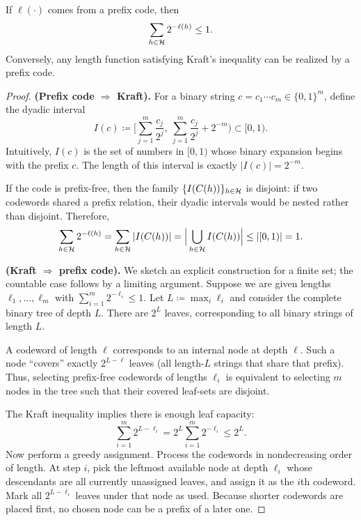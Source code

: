 \documentclass{article}
\numberwithin{equation}{section}
\newcommand{\cH}{{\cal H}}
\begin{document}
\begin{theorem}
\label{thm:kraft-lecture2}
If $\ell(\cdot)$ comes from a prefix code, then
\begin{equation}
    \sum_{h\in\cH} 2^{-\ell(h)} \le 1.
\end{equation}
Conversely, any length function satisfying Kraft's inequality can be realized by a prefix code.
\end{theorem}
\begin{proof}
\textbf{(Prefix code $\Rightarrow$ Kraft).}
For a binary string $c=c_1\cdots c_m\in\{0,1\}^m$, define the dyadic interval
\begin{equation}
    I(c) \coloneqq \Big[\sum_{j=1}^m \frac{c_j}{2^j},\ \sum_{j=1}^m \frac{c_j}{2^j} + 2^{-m}\Big) \subset [0,1).
\end{equation}
Intuitively, $I(c)$ is the set of numbers in $[0,1)$ whose binary expansion begins with the prefix $c$.
The length of this interval is exactly $|I(c)|=2^{-m}$.

If the code is prefix-free, then the family $\{I(C(h))\}_{h\in\cH}$ is disjoint: if two codewords shared a prefix relation, their dyadic intervals would be nested rather than disjoint.
Therefore,
\begin{equation}
    \sum_{h\in\cH} 2^{-\ell(h)}
    = \sum_{h\in\cH} |I(C(h))|
    = \Big|\bigcup_{h\in\cH} I(C(h))\Big|
    \le |[0,1)| = 1.
\end{equation}

\textbf{(Kraft $\Rightarrow$ prefix code).}
We sketch an explicit construction for a finite set; the countable case follows by a limiting argument.
Suppose we are given lengths $\ell_1,\dots,\ell_m$ with
\(\sum_{i=1}^m 2^{-\ell_i}\le 1\).
Let $L\coloneqq \max_i \ell_i$ and consider the complete binary tree of depth $L$.
There are $2^L$ leaves, corresponding to all binary strings of length $L$.

A codeword of length $\ell$ corresponds to an internal node at depth $\ell$.
Such a node ``covers'' exactly $2^{L-\ell}$ leaves (all length-$L$ strings that share that prefix).
Thus, selecting prefix-free codewords of lengths $\ell_i$ is equivalent to selecting $m$ nodes in the tree such that their covered leaf-sets are disjoint.

The Kraft inequality implies there is enough leaf capacity:
\begin{equation}
    \sum_{i=1}^m 2^{L-\ell_i} = 2^L\sum_{i=1}^m 2^{-\ell_i} \le 2^L.
\end{equation}
Now perform a greedy assignment.
Process the codewords in nondecreasing order of length.
At step $i$, pick the leftmost available node at depth $\ell_i$ whose descendants are all currently unassigned leaves, and assign it as the $i$th codeword.
Mark all $2^{L-\ell_i}$ leaves under that node as used.
Because shorter codewords are placed first, no chosen node can be a prefix of a later one.


\end{proof}
\end{document}
